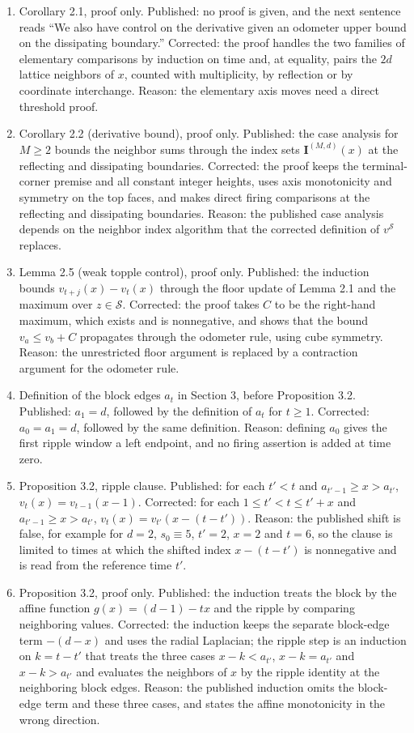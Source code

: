 \documentclass[12pt]{amsart}
\begin{document}
\begin{enumerate}
\item[C09.] Corollary 2.1, proof only. Published: no proof is given, and the next sentence reads ``We also have control on the derivative given an odometer upper bound on the dissipating boundary.'' Corrected: the proof handles the two families of elementary comparisons by induction on time and, at equality, pairs the $2d$ lattice neighbors of $x$, counted with multiplicity, by reflection or by coordinate interchange. Reason: the elementary axis moves need a direct threshold proof.
\item[C10.] Corollary 2.2 (derivative bound), proof only. Published: the case analysis for $M \geq 2$ bounds the neighbor sums through the index sets $\mathbf{I}^{(M,d)}(x)$ at the reflecting and dissipating boundaries. Corrected: the proof keeps the terminal-corner premise and all constant integer heights, uses axis monotonicity and symmetry on the top faces, and makes direct firing comparisons at the reflecting and dissipating boundaries. Reason: the published case analysis depends on the neighbor index algorithm that the corrected definition of $v^{\mathcal S}$ replaces.
\item[C11.] Lemma 2.5 (weak topple control), proof only. Published: the induction bounds $v_{t+j}(x) - v_t(x)$ through the floor update of Lemma 2.1 and the maximum over $z \in \mathcal S$. Corrected: the proof takes $C$ to be the right-hand maximum, which exists and is nonnegative, and shows that the bound $v_a \leq v_b + C$ propagates through the odometer rule, using cube symmetry. Reason: the unrestricted floor argument is replaced by a contraction argument for the odometer rule.
\item[C12.] Definition of the block edges $a_t$ in Section 3, before Proposition 3.2. Published: $a_1 = d$, followed by the definition of $a_t$ for $t \geq 1$. Corrected: $a_0 = a_1 = d$, followed by the same definition. Reason: defining $a_0$ gives the first ripple window a left endpoint, and no firing assertion is added at time zero.
\item[C13.] Proposition 3.2, ripple clause. Published: for each $t' < t$ and $a_{t'-1} \geq x > a_{t'}$, $v_{t}(x) = v_{t-1}(x-1)$. Corrected: for each $1 \leq t' < t \leq t' + x$ and $a_{t'-1} \geq x > a_{t'}$, $v_t(x) = v_{t'}(x - (t - t'))$. Reason: the published shift is false, for example for $d=2$, $s_0 \equiv 5$, $t'=2$, $x=2$ and $t=6$, so the clause is limited to times at which the shifted index $x - (t - t')$ is nonnegative and is read from the reference time $t'$.
\item[C14.] Proposition 3.2, proof only. Published: the induction treats the block by the affine function $g(x) = (d-1) - tx$ and the ripple by comparing neighboring values. Corrected: the induction keeps the separate block-edge term $-(d-x)$ and uses the radial Laplacian; the ripple step is an induction on $k=t-t'$ that treats the three cases $x-k<a_{t'}$, $x-k=a_{t'}$ and $x-k>a_{t'}$ and evaluates the neighbors of $x$ by the ripple identity at the neighboring block edges. Reason: the published induction omits the block-edge term and these three cases, and states the affine monotonicity in the wrong direction.

\end{enumerate}
\end{document}
